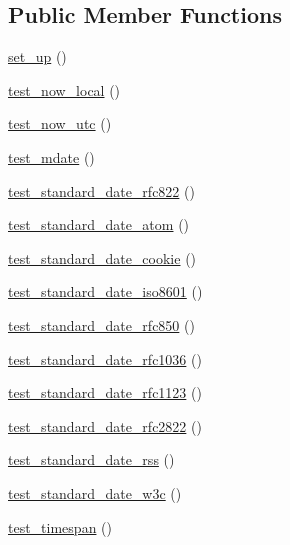 \subsection*{Public Member Functions}
\begin{DoxyCompactItemize}
\item 
\hyperlink{class_date__helper__test_a69829875c8d4b6ce94908445c4155741}{set\+\_\+up} ()
\item 
\hyperlink{class_date__helper__test_a50df6d19ef89c1b73f573e6a20676d03}{test\+\_\+now\+\_\+local} ()
\item 
\hyperlink{class_date__helper__test_a80319937b50e14b10554de6add53ea87}{test\+\_\+now\+\_\+utc} ()
\item 
\hyperlink{class_date__helper__test_aa1cf1475986b713b757861af24e78689}{test\+\_\+mdate} ()
\item 
\hyperlink{class_date__helper__test_a3c87d5a83ce4f65be5f9ec222512393c}{test\+\_\+standard\+\_\+date\+\_\+rfc822} ()
\item 
\hyperlink{class_date__helper__test_a25b03b948b32363ab5f6adcfcd9029fd}{test\+\_\+standard\+\_\+date\+\_\+atom} ()
\item 
\hyperlink{class_date__helper__test_a5b521e9e4b3c5ef0a58cf7ef681a7a8f}{test\+\_\+standard\+\_\+date\+\_\+cookie} ()
\item 
\hyperlink{class_date__helper__test_ab805ee4a981071f9f2c1f366d1f33a26}{test\+\_\+standard\+\_\+date\+\_\+iso8601} ()
\item 
\hyperlink{class_date__helper__test_afed3acbe85e8e942d427cfc997b99d33}{test\+\_\+standard\+\_\+date\+\_\+rfc850} ()
\item 
\hyperlink{class_date__helper__test_a392de7464c4cbaeae853918e82f22b78}{test\+\_\+standard\+\_\+date\+\_\+rfc1036} ()
\item 
\hyperlink{class_date__helper__test_a72317a6f9a7a682c378cd1fc869d20ba}{test\+\_\+standard\+\_\+date\+\_\+rfc1123} ()
\item 
\hyperlink{class_date__helper__test_abf0bd01ce3b3ae5cb525e6511e8d398d}{test\+\_\+standard\+\_\+date\+\_\+rfc2822} ()
\item 
\hyperlink{class_date__helper__test_a694d2b18fa912896c30b17fd707965d5}{test\+\_\+standard\+\_\+date\+\_\+rss} ()
\item 
\hyperlink{class_date__helper__test_a15ed9ad667ad442fe3f5aefa04779fa9}{test\+\_\+standard\+\_\+date\+\_\+w3c} ()
\item 
\hyperlink{class_date__helper__test_af77eb4ba420ccafe8eaf9f387364a0fd}{test\+\_\+timespan} ()
\item 

\end{DoxyCompactItemize}
